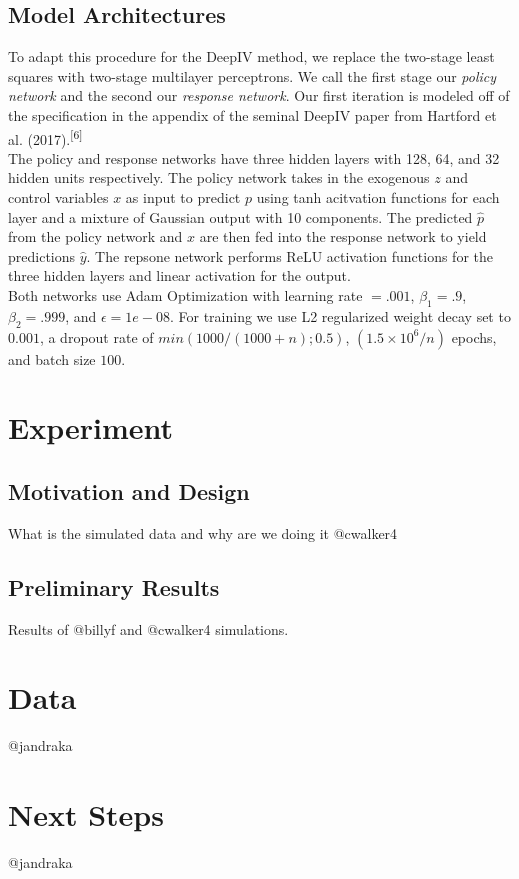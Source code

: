 \documentclass[11pt, oneside]{article}   	%
\begin{document}
\subsection{Model Architectures}

To adapt this procedure for the DeepIV method, we replace the two-stage least squares with two-stage multilayer perceptrons. We call the first stage our \emph{policy network} and the second our \emph{response network}. Our first iteration is modeled off of the specification in the appendix of the seminal DeepIV paper from Hartford et al. (2017).\textsuperscript{[6]}\\

The policy and response networks have three hidden layers with 128, 64, and 32 hidden units respectively. The policy network takes in the exogenous $z$ and control variables $x$ as input to predict $p$ using tanh acitvation functions for each layer and a mixture of Gaussian output with 10 components. The predicted $\hat{p}$ from the policy network and $x$ are then fed into the response network to yield predictions $\hat{y}$. The repsone network performs ReLU activation functions for the three hidden layers and linear activation for the output. \\

Both networks use Adam Optimization with learning rate $=.001$, $\beta_1 = .9$, $\beta_2 = .999$, and $\epsilon = 1e-08$. For training we use L2 regularized weight decay set to $0.001$, a dropout rate of $min(1000/(1000+n); 0.5)$, $(1.5 \times 10^6/n)$ epochs, and batch size $100$. 


\section{Experiment}
\subsection{Motivation and Design}
What is the simulated data and why are we doing it @cwalker4

\subsection{Preliminary Results} 
Results of @billyf and @cwalker4 simulations.

\section{Data}
@jandraka

\section{Next Steps}
@jandraka 
\end{document}
